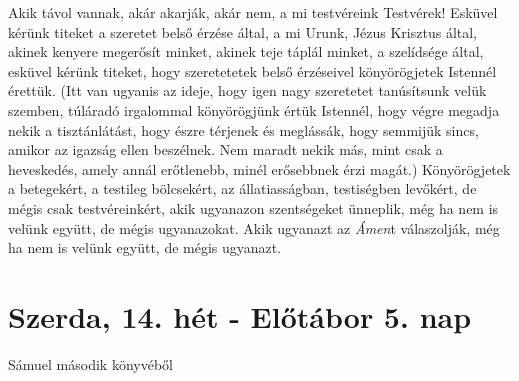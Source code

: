 \documentclass[twoside]{article}
\begin{document}
\begin{lectio}{Akik távol vannak, akár akarják, akár nem, a mi testvéreink}
Testvérek! Esküvel kérünk titeket a szeretet belső érzése által, a mi Urunk, Jézus Krisztus által, akinek kenyere megerősít minket, akinek teje táplál minket, a szelídsége által, esküvel kérünk titeket, hogy szeretetetek belső érzéseivel könyörögjetek Istennél érettük. (Itt van ugyanis az ideje, hogy igen nagy szeretetet tanúsítsunk velük szemben, túláradó irgalommal könyörögjünk értük Istennél, hogy végre megadja nekik a tisztánlátást, hogy észre térjenek és meglássák, hogy semmijük sincs, amikor az igazság ellen beszélnek. Nem maradt nekik más, mint csak a heveskedés, amely annál erőtlenebb, minél erősebbnek érzi magát.) Könyörögjetek a betegekért, a testileg bölcsekért, az állatiasságban, testiségben levőkért, de mégis csak testvéreinkért, akik ugyanazon szentségeket ünneplik, még ha nem is velünk együtt, de mégis ugyanazokat. Akik ugyanazt az \textit{Ámen}t válaszolják, még ha nem is velünk együtt, de mégis ugyanazt.
\end{lectio}



\section*{Szerda, 14. hét - Előtábor 5. nap}

Sámuel második könyvéből
\end{document}
